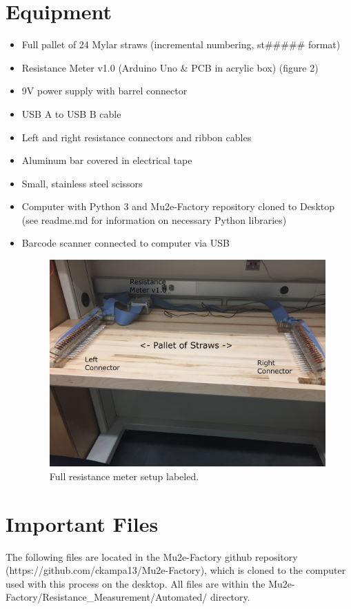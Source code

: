\documentclass[letterpaper,12pt]{article}
\begin{document}
\section{Equipment}
\begin{itemize}
	\item Full pallet of 24 Mylar straws (incremental numbering, st\#\#\#\#\# format)
	\item Resistance Meter v1.0 (Arduino Uno \& PCB in acrylic box) (figure 2)
	\item 9V power supply with barrel connector
	\item USB A to USB B cable
	\item Left and right resistance connectors and ribbon cables
	\item Aluminum bar covered in electrical tape
	\item Small, stainless steel scissors
	\item Computer with Python 3 and Mu2e-Factory repository cloned to Desktop (see readme.md for information on necessary Python libraries)
	\item Barcode scanner connected to computer via USB
	\begin{figure}[h]
		\centering
		\includegraphics[width=\textwidth]{full_setup2_labeled}
		\caption{Full resistance meter setup labeled.}
	\end{figure}
\end{itemize}


\section{Important Files}
The following files are located in the Mu2e-Factory github repository (https://github.com/ckampa13/Mu2e-Factory), which is cloned to the computer used with this process on the desktop. All files are within the Mu2e-Factory/Resistance\_Measurement/Automated/ directory.
\end{document}
